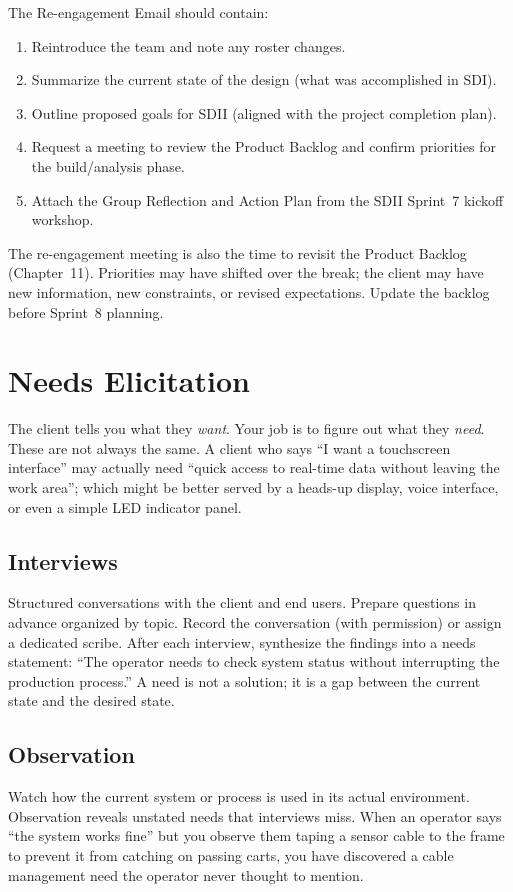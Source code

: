 The Re-engagement Email should contain:
\begin{enumerate}[nosep,leftmargin=1.5em]
\item Reintroduce the team and note any roster changes.
\item Summarize the current state of the design (what was accomplished in SDI).
\item Outline proposed goals for SDII (aligned with the project completion plan).
\item Request a meeting to review the Product Backlog and confirm priorities for the build/analysis phase.
\item Attach the Group Reflection and Action Plan from the SDII Sprint~7 kickoff workshop.
\end{enumerate}

The re-engagement meeting is also the time to revisit the Product Backlog (Chapter~11). Priorities may have shifted over the break; the client may have new information, new constraints, or revised expectations. Update the backlog before Sprint~8 planning.

\section{Needs Elicitation}
The client tells you what they \emph{want}. Your job is to figure out what they \emph{need}. These are not always the same. A client who says ``I want a touchscreen interface'' may actually need ``quick access to real-time data without leaving the work area''; which might be better served by a heads-up display, voice interface, or even a simple LED indicator panel.

\subsection{Interviews}
Structured conversations with the client and end users. Prepare questions in advance organized by topic. Record the conversation (with permission) or assign a dedicated scribe. After each interview, synthesize the findings into a needs statement: ``The operator needs to check system status without interrupting the production process.'' A need is not a solution; it is a gap between the current state and the desired state.

\subsection{Observation}
Watch how the current system or process is used in its actual environment. Observation reveals unstated needs that interviews miss. When an operator says ``the system works fine'' but you observe them taping a sensor cable to the frame to prevent it from catching on passing carts, you have discovered a cable management need the operator never thought to mention.

